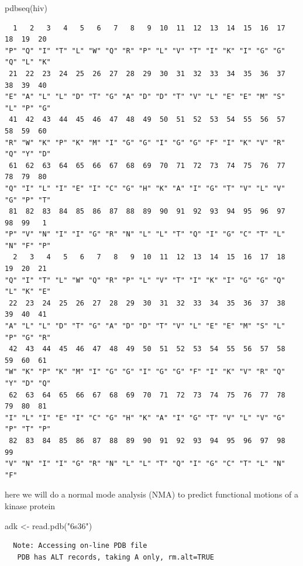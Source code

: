 \documentclass[
  letterpaper,
  DIV=11,
  numbers=noendperiod]{scrartcl}
\newenvironment{Shaded}{\begin{snugshade}}{\end{snugshade}}
\newcommand{\FunctionTok}[1]{\textcolor[rgb]{0.28,0.35,0.67}{#1}}
\newcommand{\NormalTok}[1]{\textcolor[rgb]{0.00,0.23,0.31}{#1}}
\newcommand{\OtherTok}[1]{\textcolor[rgb]{0.00,0.23,0.31}{#1}}
\newcommand{\StringTok}[1]{\textcolor[rgb]{0.13,0.47,0.30}{#1}}
\begin{document}
\begin{Shaded}
\begin{Highlighting}[]
\FunctionTok{pdbseq}\NormalTok{(hiv)}
\end{Highlighting}
\end{Shaded}

\begin{verbatim}
  1   2   3   4   5   6   7   8   9  10  11  12  13  14  15  16  17  18  19  20 
"P" "Q" "I" "T" "L" "W" "Q" "R" "P" "L" "V" "T" "I" "K" "I" "G" "G" "Q" "L" "K" 
 21  22  23  24  25  26  27  28  29  30  31  32  33  34  35  36  37  38  39  40 
"E" "A" "L" "L" "D" "T" "G" "A" "D" "D" "T" "V" "L" "E" "E" "M" "S" "L" "P" "G" 
 41  42  43  44  45  46  47  48  49  50  51  52  53  54  55  56  57  58  59  60 
"R" "W" "K" "P" "K" "M" "I" "G" "G" "I" "G" "G" "F" "I" "K" "V" "R" "Q" "Y" "D" 
 61  62  63  64  65  66  67  68  69  70  71  72  73  74  75  76  77  78  79  80 
"Q" "I" "L" "I" "E" "I" "C" "G" "H" "K" "A" "I" "G" "T" "V" "L" "V" "G" "P" "T" 
 81  82  83  84  85  86  87  88  89  90  91  92  93  94  95  96  97  98  99   1 
"P" "V" "N" "I" "I" "G" "R" "N" "L" "L" "T" "Q" "I" "G" "C" "T" "L" "N" "F" "P" 
  2   3   4   5   6   7   8   9  10  11  12  13  14  15  16  17  18  19  20  21 
"Q" "I" "T" "L" "W" "Q" "R" "P" "L" "V" "T" "I" "K" "I" "G" "G" "Q" "L" "K" "E" 
 22  23  24  25  26  27  28  29  30  31  32  33  34  35  36  37  38  39  40  41 
"A" "L" "L" "D" "T" "G" "A" "D" "D" "T" "V" "L" "E" "E" "M" "S" "L" "P" "G" "R" 
 42  43  44  45  46  47  48  49  50  51  52  53  54  55  56  57  58  59  60  61 
"W" "K" "P" "K" "M" "I" "G" "G" "I" "G" "G" "F" "I" "K" "V" "R" "Q" "Y" "D" "Q" 
 62  63  64  65  66  67  68  69  70  71  72  73  74  75  76  77  78  79  80  81 
"I" "L" "I" "E" "I" "C" "G" "H" "K" "A" "I" "G" "T" "V" "L" "V" "G" "P" "T" "P" 
 82  83  84  85  86  87  88  89  90  91  92  93  94  95  96  97  98  99 
"V" "N" "I" "I" "G" "R" "N" "L" "L" "T" "Q" "I" "G" "C" "T" "L" "N" "F" 
\end{verbatim}

here we will do a normal mode analysis (NMA) to predict functional
motions of a kinase protein

\begin{Shaded}
\begin{Highlighting}[]
\NormalTok{adk }\OtherTok{\textless{}{-}} \FunctionTok{read.pdb}\NormalTok{(}\StringTok{"6s36"}\NormalTok{)}
\end{Highlighting}
\end{Shaded}

\begin{verbatim}
  Note: Accessing on-line PDB file
   PDB has ALT records, taking A only, rm.alt=TRUE
\end{verbatim}
\end{document}
